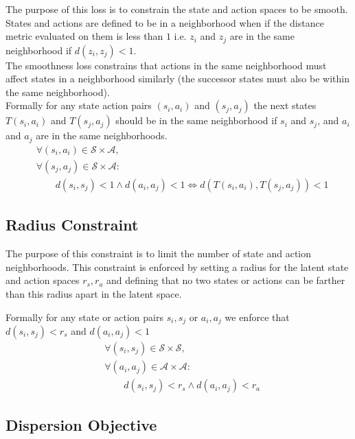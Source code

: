 \documentclass{article}
\begin{document}
The purpose of this loss is to constrain the state and action spaces to be smooth.
States and actions are defined to be in a neighborhood when if the distance metric evaluated on them is less than \(1\) i.e. \(z_i\) and \(z_j\) are in the same neighborhood if \(d(z_i, z_j) < 1\).\\

\noindent
The smoothness loss constrains that actions in the same neighborhood must affect states in a neighborhood similarly (the successor states must also be within the same neighborhood).\\

\noindent
Formally for any state action pairs \((s_i,a_i)\) and \((s_j,a_j)\) the next states \(T(s_i, a_i)\) and \(T(s_j, a_j)\) should be in the same neighborhood if \(s_i\) and \(s_j\), and \(a_i\) and \(a_j\) are in the same neighborhoods.
\begin{align*}
     & \forall (s_i, a_i) \in \mathcal{S} \times \mathcal{A},                            \\
     & \forall (s_j, a_j) \in \mathcal{S} \times \mathcal{A}:                            \\
     & \qquad d(s_i, s_j) < 1 \land d(a_i, a_j) < 1 \iff d(T(s_i, a_i), T(s_j, a_j)) < 1
\end{align*}

\subsection*{Radius Constraint}

The purpose of this constraint is to limit the number of state and action neighborhoods.
This constraint is enforced by setting a radius for the latent state and action spaces \(r_s, r_a\) and defining that no two states or actions can be farther than this radius apart in the latent space.

Formally for any state or action pairs \(s_i, s_j\) or \(a_i, a_j\) we enforce that \(d(s_i, s_j) < r_s\) and \(d(a_i, a_j) < 1\)
\begin{align*}
     & \forall (s_i, s_j) \in \mathcal{S} \times \mathcal{S}, \\
     & \forall (a_i, a_j) \in \mathcal{A} \times \mathcal{A}: \\
     & \qquad d(s_i, s_j) < r_s \land d(a_i, a_j) < r_a
\end{align*}


\subsection*{Dispersion Objective}
\end{document}

